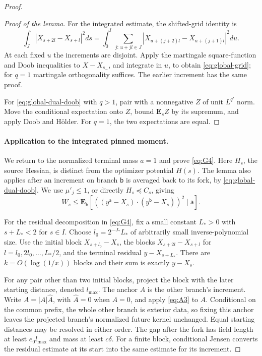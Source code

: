 \begin{proof}
\begin{proof}[Proof of the lemma]
For the integrated estimate, the shifted-grid identity is
\[
 \int_J|X_{s+2l}-X_{s+l}|^2ds
 =\int_0^l\sum_{j:\,u+jl\in J}
       |X_{u+(j+2)l}-X_{u+(j+1)l}|^2du.
\]
At each fixed \(u\) the increments are disjoint. Apply the martingale
square-function and Doob inequalities to \(X-X_{s_-}\), and integrate
in \(u\), to obtain \eqref{eq:global-grid}; for \(q=1\) martingale
orthogonality suffices. The earlier increment has the same proof.

For \eqref{eq:global-dual-doob} with \(q>1\), pair with a nonnegative
\(Z\) of unit \(L^{q'}\) norm. Move the conditional expectation onto
\(Z\), bound \(\mathbf E_sZ\) by its supremum, and apply Doob and
H\"older. For \(q=1\), the two expectations are equal.
\end{proof}

\paragraph{Application to the integrated pinned moment.}
We return to the normalized terminal mass \(a=1\) and prove
\eqref{eq:G4}. Here \(H_s\), the source Hessian, is distinct from
the optimizer potential \(H(s)\). The lemma also applies after an
increment on branch \(\mathsf b\) is averaged back to its fork, by
\eqref{eq:global-dual-doob}. We use \(\mu'_j\le1\), or directly
\(H_s\preceq C_s\), giving
\[
 W_s\le\mathbf E_{\mathsf b}[((y^{\mathsf a}-X_s)\cdot(y^{\mathsf b}-X_s))^2\mid\mathsf a].
\]

For the residual decomposition in \eqref{eq:G4}, fix a small constant
\(L_*>0\) with \(s+L_*<2\) for \(s\in I\). Choose
\(l_0=2^{-J_*}L_*\) of arbitrarily small inverse-polynomial size.
Use the initial block \(X_{s+l_0}-X_s\), the blocks
\(X_{s+2l}-X_{s+l}\) for \(l=l_0,2l_0,\ldots,L_*/2\), and
the terminal residual \(y-X_{s+L_*}\). There are
\(k=O(\log(1/x))\) blocks and their sum is exactly \(y-X_s\).

For any pair other than two initial blocks, project the block with
the later starting distance, denoted \(l_{\max}\). The anchor
\(A\) is the other branch's increment. Write
\(A=|A|\widehat A\), with \(\widehat A=0\) when \(A=0\),
and apply \eqref{eq:A3} to \(\widehat A\). Conditional on the
common prefix, the whole other branch is exterior data, so fixing
this anchor leaves the projected branch's normalized future kernel
unchanged. Equal starting distances may be resolved in either order.
The gap after the fork has field length at least \(e_0l_{\max}\)
and mass at least \(c\delta\). For a finite block, conditional
Jensen converts the residual estimate at its start into the same
estimate for its increment.


\end{proof}
